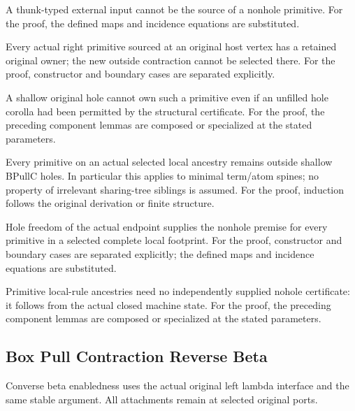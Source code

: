 A thunk-typed external input cannot be the source of a nonhole primitive.
For the proof, the defined maps and incidence equations are substituted.
\par{}

Every actual right primitive sourced at an original host vertex has a retained original owner; the new outside contraction cannot be selected there.
For the proof, constructor and boundary cases are separated explicitly.
\par{}

A shallow original hole cannot own such a primitive even if an unfilled hole corolla had been permitted by the structural certificate.
For the proof, the preceding component lemmas are composed or specialized at the stated parameters.
\par{}

Every primitive on an actual selected local ancestry remains outside shallow BPullC holes. In particular this applies to minimal term/atom spines; no property of irrelevant sharing-tree siblings is assumed.
For the proof, induction follows the original derivation or finite structure.
\par{}

Hole freedom of the actual endpoint supplies the nonhole premise for every primitive in a selected complete local footprint.
For the proof, constructor and boundary cases are separated explicitly; the defined maps and incidence equations are substituted.
\par{}

Primitive local-rule ancestries need no independently supplied nohole certificate: it follows from the actual closed machine state.
For the proof, the preceding component lemmas are composed or specialized at the stated parameters.
\par{}

\subsection{Box Pull Contraction Reverse Beta}
Converse beta enabledness uses the actual original left lambda interface and the same stable argument. All attachments remain at selected original ports.

